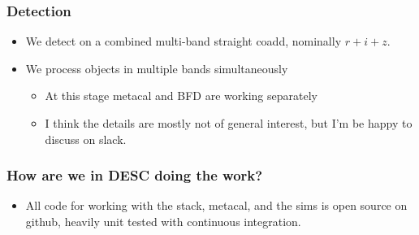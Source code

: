 \documentclass{beamer}
\begin{document}
\frame
{

    \frametitle{Detection}


    \begin{itemize}

        \item We detect on a combined multi-band straight coadd, nominally
            $r+i+z$.

        \item We process objects in multiple bands simultaneously 
            \begin{itemize}
                \item At this stage metacal and BFD are working separately
                \item I think the details are mostly not of general interest, but
                    I'm be happy to discuss on slack.
            \end{itemize}

    \end{itemize}

}

\frame
{

    \frametitle{How are we in DESC doing the work?}

    \begin{itemize}

        \item All code for working with the stack, metacal, and the sims is
            open source on github, heavily unit tested with continuous
            integration.

    \end{itemize}

}
\end{document}

